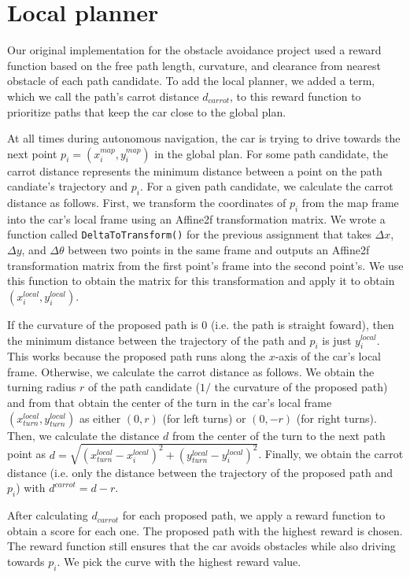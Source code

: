 \section{Local planner}

Our original implementation for the obstacle avoidance project used a reward function based on the free path length, curvature, and clearance from nearest obstacle of each path candidate. To add the local planner, we added a term, which we call the path's carrot distance $d_{carrot}$, to this reward function to prioritize paths that keep the car close to the global plan.

At all times during autonomous navigation, the car is trying to drive towards the next point $p_i = (x_i^{map}, y_i^{map})$ in the global plan. For some path candidate, the carrot distance represents the minimum distance between a point on the path candiate's trajectory and $p_i$. For a given path candidate, we calculate the carrot distance as follows. First, we transform the coordinates of $p_i$ from the map frame into the car's local frame using an Affine2f transformation matrix. We wrote a function called {\tt DeltaToTransform()} for the previous assignment that takes $\Delta x$, $\Delta y$, and $\Delta \theta$ between two points in the same frame and outputs an Affine2f transformation matrix from the first point's frame into the second point's. We use this function to obtain the matrix for this transformation and apply it to obtain $(x_i^{local}, y_i^{local})$.

If the curvature of the proposed path is 0 (i.e. the path is straight foward), then the minimum distance between the trajectory of the path and $p_i$ is just $y_i^{local}$. This works because the proposed path runs along the $x$-axis of the car's local frame. Otherwise, we calculate the carrot distance as follows. We obtain the turning radius $r$ of the path candidate ($1 / $ the curvature of the proposed path) and from that obtain the center of the turn in the car's local frame $(x_{turn}^{local}, y_{turn}^{local})$ as either $(0, r)$ (for left turns) or $(0, -r)$ (for right turns). Then, we calculate the distance $d$ from the center of the turn to the next path point as $d = \sqrt{(x_{turn}^{local} - x_i^{local})^2 + (y_{turn}^{local} - y_i^{local})^2}$. Finally, we obtain the carrot distance (i.e. only the distance between the trajectory of the proposed path and $p_i$) with $d^{carrot} = d - r$.

After calculating $d_{carrot}$ for each proposed path, we apply a reward function to obtain a score for each one. The proposed path with the highest reward is chosen. The reward function still ensures that the car avoids obstacles while also driving towards $p_i$. We pick the curve with the highest reward value. 

